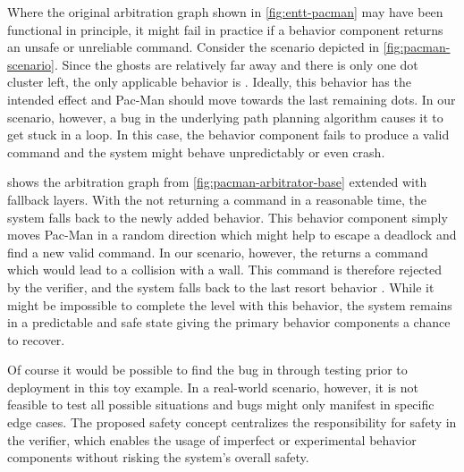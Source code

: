 Where the original arbitration graph shown in \cref{fig:entt-pacman} may have been functional in principle, it might fail in practice if a behavior component returns an unsafe or unreliable command.
Consider the scenario depicted in \cref{fig:pacman-scenario}.
Since the ghosts are relatively far away and there is only one dot cluster left, the only applicable behavior is .
Ideally, this behavior has the intended effect and Pac-Man should move towards the last remaining dots.
In our scenario, however, a bug in the underlying path planning algorithm causes it to get stuck in a loop.
In this case, the behavior component fails to produce a valid command and the system might behave unpredictably or even crash.

 shows the arbitration graph from \cref{fig:pacman-arbitrator-base} extended with fallback layers.
With the  not returning a command in a reasonable time, the system falls back to the newly added  behavior.
This behavior component simply moves Pac-Man in a random direction
which might help to escape a deadlock and find a new valid command.
In our scenario, however, the  returns a command which would lead to a collision with a wall.
This command is therefore rejected by the verifier, and the system falls back to the last resort behavior .
While it might be impossible to complete the level with this behavior, the system remains in a predictable and safe state giving the primary behavior components a chance to recover.

Of course it would be possible to find the bug in  through testing prior to deployment in this toy example.
In a real-world scenario, however, it is not feasible to test all possible situations and bugs might only manifest in specific edge cases.
The proposed safety concept centralizes the responsibility for safety in the verifier, which enables the usage of imperfect or experimental behavior components without risking the system's overall safety.

